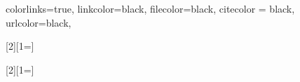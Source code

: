 \newcommand\blankPage
{
    \afterpage{\blankpage}
}

\hypersetup
{
     colorlinks=true,
     linkcolor=black,
     filecolor=black,
     citecolor = black,      
     urlcolor=black,
}


\usepackage{xargs} 
[2][1=]{}

[2][1=]{}

\renewcommand\arraystretch{1.25}

\renewcommand{\vec}[1]{\boldsymbol{\mathbf{#1}}}
\newcommand{\ten}[1]  {\boldsymbol{\mathbf{#1}}}
\newcommand{\dif}{\text{d}}
\newcommand{\grad}{\bm{\nabla}}
\newcommand{\tr}{\text{tr}}
\newcommand{\transpose}{\mathrm{T}}
\newcommand{\sign}{\mathrm{sign}}
\newcommand{\gvar}{\vec{\phi}}
\newcommand{\nrm}[1]{\tilde{#1}}

\newcommand*\mystrut[1]{\vrule width0pt height0pt depth#1\relax}

\DeclareSIUnit{\m}{\metre}
\DeclareSIUnit{\s}{\second}
\DeclareSIUnit{\mm}{\metre\metre}
\DeclareSIUnit{\nmm}{\newton\mm} 
\DeclareSIUnit{\mpa}{\mega\pascal}
\DeclareSIUnit{\gpa}{\giga\pascal}


\makeatletter
\newcommand{\vast}{\bBigg@{4}}
\newcommand{\Vast}{\bBigg@{5}}
\makeatother

\newcommand\implicitCellColor{\cellcolor{blue!50}}

\newcommand\implicitCellColorTikz[1]{\tikz[overlay, remember picture,baseline=-\the\dimexpr\fontdimen22\textfont2\relax]\node[rectangle,fill=blue!50,sharp corners,fill opacity = 0.2,text opacity =1] {$#1$};} 

